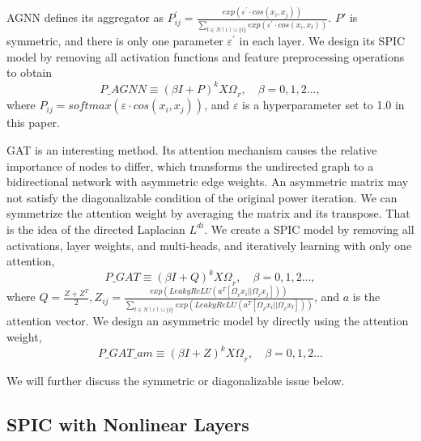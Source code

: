 \documentclass[preprint,11pt]{elsarticle}
\begin{document}
AGNN defines its aggregator as $P_{ij}^{'} = \frac{exp(\varepsilon^{'} \cdot cos(x_i, x_j))}{\sum_{t \in N(i) \cup \{i\}} exp(\varepsilon^{'} \cdot cos(x_i, x_t))}$. $P'$  is symmetric, and there is only one parameter $\varepsilon^{'}$ in each layer. We design its SPIC model by removing all activation functions and feature preprocessing operations to obtain
\begin{equation}
P\_AGNN \equiv (\beta I + P)^k X \Omega_{_F}, \quad \beta=0,1,2...	,
\end{equation}
where $P_{ij}=softmax(\varepsilon\cdot cos(x_i, x_j))$, and $\varepsilon$ is a hyperparameter set to 1.0 in this paper.

GAT is an interesting method. Its attention mechanism causes the relative importance of nodes to differ, which transforms the undirected graph to a bidirectional network with asymmetric edge weights. An asymmetric matrix may not satisfy the diagonalizable condition of the original power iteration. We can symmetrize the attention weight by averaging the matrix and its transpose. That is the idea of the directed Laplacian $L^{di}$.  We create a SPIC model by removing all activations, layer weights, and multi-heads, and iteratively learning with only one attention,
 \begin{equation}
P\_GAT \equiv (\beta I + Q)^k X \Omega_{_F}, \quad \beta=0,1,2...	,
\end{equation}
where $Q = \frac{Z+Z^T}{2}, Z_{ij} = \frac{exp(LeakyReLU(a^T[\Omega_{_F} x_i || \Omega_{_F}x_j]))}{\sum_{t \in N(i) \cup \{i\}} exp(LeakyReLU(a^T[\Omega_{_F} x_i || \Omega_{_F}x_t]))}$, and $a$ is the attention vector.
We design an asymmetric model by directly using the attention weight,
 \begin{equation}
 P\_GAT\_am \equiv (\beta I + Z)^k X \Omega_{_F}, \quad \beta=0,1,2...
 \end{equation}
 
We will further discuss the symmetric or diagonalizable issue below.

\subsection{SPIC with Nonlinear Layers}
\end{document}
